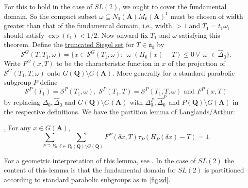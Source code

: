 \documentclass{ims9x6}
\def\A{\mathbf A}
\def\Q{\mathbf Q}
\def\SSS{\mathcal S}
\def\aaa{\mathfrak a}
\def\bs{\setminus}
\begin{document}
For this to hold in the case of $SL(2)$, we ought to cover the fundamental domain. So the compact subset $\omega \subseteq N_0(\A) M_0(\A)^1$ must be chosen of width greater than that of the fundamental domain, i.e., width $> 1$ and $T_1 = t_1 \omega_1$ should satisfy $\exp(t_1) < 1/2$. Now onward fix $T_1$ and $\omega$ satisfying this theorem. Define the \underline{truncated Siegel set} for $T \in \aaa_0$ by
\[ \SSS^G(T, T_1, \omega) = \{ x \in \SSS^G(T_1, \omega) : \varpi(H_0(x) - T) \leq 0 \ \forall \varpi \in \hat\Delta_0 \}. \]
Write $F^G(x, T)$ to be the characteristic function in $x$ of the projection of $\SSS^G(T_1, T, \omega)$ onto $G(\Q)\bs G(\A)$. More generally for a standard parabolic subgroup $P$ define 
\[ \SSS^P(T_1) = \SSS^P(T_1, \omega), \; \SSS^P(T_1, T) = \SSS^P(T_1, T, \omega) \text{ and } F^P(x, T) \]
by replacing $\Delta_0, \hat\Delta_0$ and $G(\Q)\bs G(\A)$ with $\Delta_0^P, \hat \Delta_0^P$ and $P(\Q)\bs G(\A)$ in the respective definitions. We have the partition lemma of Langlands/Arthur:
\begin{lemma} \label{partition_lemma} \cite[Lemma~6.4]{duke}, \cite[Lemma~2.12]{MR0579181}
	For any $x \in G(\A)$, 
	\[ \sum_{P \supseteq P_0} \sum_{\delta \in P_0(\Q) \bs G(\Q)} F^P(\delta x, T) \tau_P(H_P(\delta x) - T) = 1. \]
\end{lemma}
For a geometric interpretation of this lemma, see \cite[p.~39]{clay}. In the case of $SL(2)$ the content of this lemma is that the fundamental domain for $SL(2)$ is partitioned according to standard parabolic subgroups as in \cref{fig:sd}.
\end{document}
